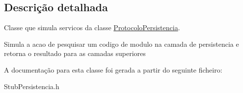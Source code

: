 \subsection{\-Descrição detalhada}
\-Classe que simula servicos da classe \hyperlink{class_protocolo_persistencia}{\-Protocolo\-Persistencia}. 

\-Simula a acao de pesquisar um codigo de modulo na camada de persistencia e retorna o resultado para as camadas superiores 

\-A documentação para esta classe foi gerada a partir do seguinte ficheiro\-:\begin{DoxyCompactItemize}
\item 
\-Stub\-Persistencia.\-h\end{DoxyCompactItemize}
